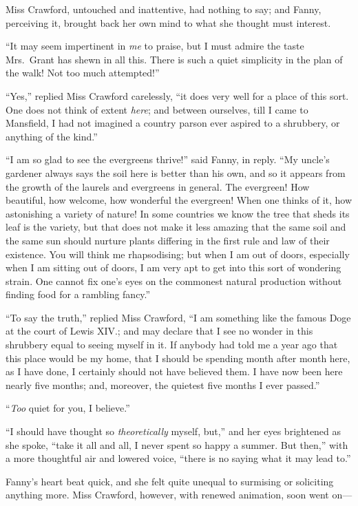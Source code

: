 Miss Crawford, untouched and inattentive, had nothing
to say; and Fanny, perceiving it, brought back her own
mind to what she thought must interest.

``It may seem impertinent in \emph{me} to praise, but I must
admire the taste Mrs.\ Grant has shewn in all this.
There is such a quiet simplicity in the plan of the walk!
Not too much attempted!''

``Yes,'' replied Miss Crawford carelessly, ``it does
very well for a place of this sort.  One does not think
of extent \emph{here}; and between ourselves, till I came
to Mansfield, I had not imagined a country parson
ever aspired to a shrubbery, or anything of the kind.''

``I am so glad to see the evergreens thrive!'' said Fanny,
in reply.  ``My uncle's gardener always says the soil here
is better than his own, and so it appears from the growth
of the laurels and evergreens in general.  The evergreen!
How beautiful, how welcome, how wonderful the evergreen!
When one thinks of it, how astonishing a variety of nature!
In some countries we know the tree that sheds its leaf
is the variety, but that does not make it less amazing
that the same soil and the same sun should nurture plants
differing in the first rule and law of their existence.
You will think me rhapsodising; but when I am out of doors,
especially when I am sitting out of doors, I am very apt
to get into this sort of wondering strain.  One cannot fix
one's eyes on the commonest natural production without
finding food for a rambling fancy.''

``To say the truth,'' replied Miss Crawford, ``I am something
like the famous Doge at the court of Lewis XIV.;
and may declare that I see no wonder in this shrubbery
equal to seeing myself in it.  If anybody had told
me a year ago that this place would be my home,
that I should be spending month after month here, as I
have done, I certainly should not have believed them.
I have now been here nearly five months; and, moreover,
the quietest five months I ever passed.''

``\emph{Too} quiet for you, I believe.''

``I should have thought so \emph{theoretically} myself, but,''
and her eyes brightened as she spoke, ``take it all
and all, I never spent so happy a summer.  But then,''
with a more thoughtful air and lowered voice, ``there is
no saying what it may lead to.''

Fanny's heart beat quick, and she felt quite unequal
to surmising or soliciting anything more.  Miss Crawford,
however, with renewed animation, soon went on---%

